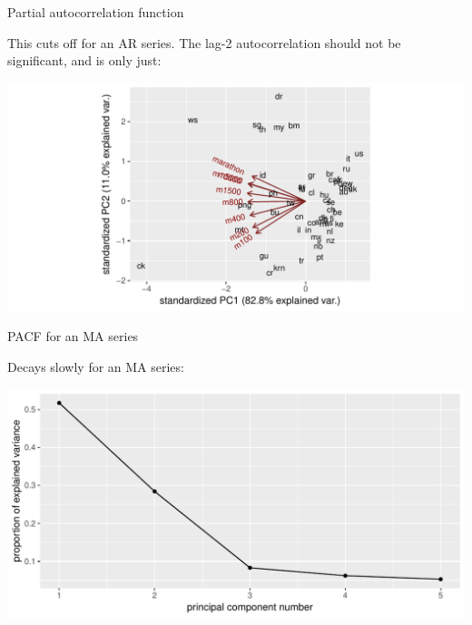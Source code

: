 \begin{frame}[fragile]{Partial autocorrelation function}
  
This cuts off for an AR series.
The lag-2 autocorrelation should not be significant, and is only just:


\begin{knitrout}
\color{fgcolor}\begin{kframe}
\begin{alltt}
\end{alltt}
\end{kframe}
\includegraphics[width=\maxwidth]{figure/unnamed-chunk-26-1} 

\end{knitrout}
  
\end{frame}


\begin{frame}[fragile]{PACF for an MA series}
  
Decays slowly for an MA series:

\begin{knitrout}
\color{fgcolor}\begin{kframe}
\begin{alltt}
\end{alltt}
\end{kframe}
\includegraphics[width=\maxwidth]{figure/unnamed-chunk-27-1} 

\end{knitrout}
  
\end{frame}


